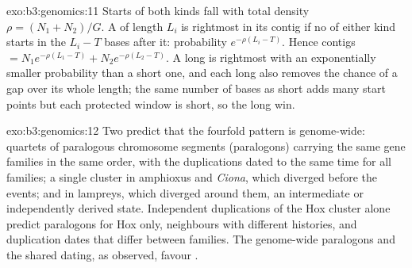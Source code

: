\begin{solution}{exo:b3:genomics:11}
Starts of both kinds fall with total density $\rho = (N_{1} +
N_{2})/G$. A  of length $L_{i}$ is rightmost in its contig if no
 of either kind starts in the $L_{i} - T$ bases after it:
probability $e^{-\rho(L_{i} - T)}$. Hence contigs $= N_{1}
e^{-\rho(L_{1} - T)} + N_{2} e^{-\rho(L_{2} - T)}$. A long  is
rightmost with an exponentially smaller probability than a short one,
and each long  also removes the chance of a gap over its whole
length; the same number of bases as short  adds many start
points but each protected window is short, so the long  win.
\end{solution}

\begin{solution}{exo:b3:genomics:12}
Two  predict that the fourfold pattern is
genome-wide: quartets of paralogous chromosome segments (paralogons)
carrying the same gene families in the same order, with the
duplications dated to the same time for all families; a single cluster
in amphioxus and \emph{Ciona}, which diverged before the events; and
in lampreys, which diverged around them, an intermediate or
independently derived state. Independent duplications of the Hox
cluster alone predict paralogons for Hox only, neighbours with
different histories, and duplication dates that differ between
families. The genome-wide paralogons and the shared dating, as
observed, favour .
\end{solution}


